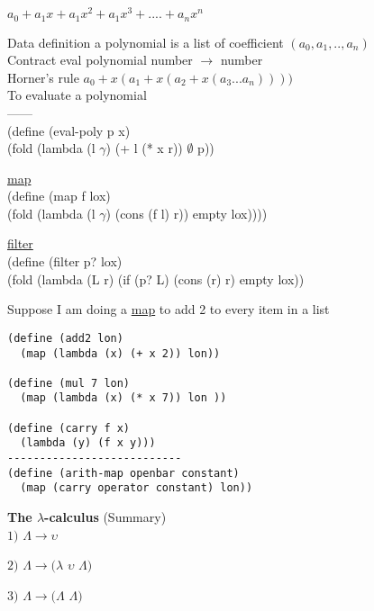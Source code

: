 \documentclass{article}
\begin{document}
\begin{center}
${a}_{0} + {a}_{1}x + {a}_{1}{x}^{2} + {a}_{1}{x}^{3} +....+ {a}_{n}{x}^{n}$ 
\end{center}

\begin{flushleft}
Data definition a polynomial is a list of coefficient $({a}_{0},{a}_{1},..,{a}_{n})$\\
Contract eval polynomial number $\rightarrow$ number\\
Horner's rule ${a}_{0} + x({a}_{1} + x({a}_{2} + x({a}_{3}...{a}_{n}))))$\\
To evaluate a polynomial\\
------\\
(define (eval-poly p x)\\
(fold (lambda (l $\gamma$) (+ l (* x r)) $\emptyset$ p))
\end{flushleft}

\begin{flushleft}
\underline{map}\\
(define (map f lox)\\
(fold (lambda (l $\gamma$) (cons (f l) r)) empty lox))))\\
\end{flushleft}

\begin{flushleft}
\underline{filter}\\
(define (filter p? lox)\\
(fold (lambda (L r) (if (p? L) (cons (r) r) empty lox))\\
\end{flushleft}

\doublespacing
\begin{flushleft}
Suppose I am doing a \underline{map} to add 2 to every item in a list
\begin{verbatim}
(define (add2 lon)
  (map (lambda (x) (+ x 2)) lon))
  
(define (mul 7 lon)
  (map (lambda (x) (* x 7)) lon ))
  
(define (carry f x)
  (lambda (y) (f x y)))
---------------------------
(define (arith-map openbar constant)
  (map (carry operator constant) lon))
\end{verbatim}
\end{flushleft}

\begin{flushleft}
\textbf{The $\lambda$-calculus} (Summary)\\
$1)$ $\Lambda\rightarrow\upsilon$

$2)$ $\Lambda\rightarrow(\lambda$ 
$\upsilon$
$\Lambda)$

$3)$ $\Lambda\rightarrow(\Lambda$
$\Lambda)$
\end{flushleft}
\end{document}
